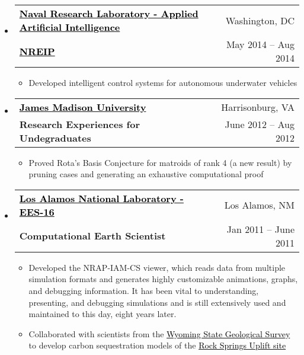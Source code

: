 \documentclass[letterpaper,12pt]{article}
\makeatletter
\newcommand{\link}[2]{\href{#1}{\textcolor{black}{#2}}}
\newcommand{\resitem}[1]{\item #1 \vspace{-2pt}}
\newcommand{\ressubheading}[4]{
	\begin{tabular*}{6.5in}{l@{\extracolsep{\fill}}r}
			\textbf{#1} & #2 \\
			\textbf{#3} & #4 \\
	\end{tabular*}\vspace{-6pt}
}
\makeatother
\begin{document}
\begin{itemize}
        \item \ressubheading
            {\link{http://www.nrl.navy.mil/}{Naval Research Laboratory - Applied Artificial Intelligence}}
            {Washington, DC}
            {\link{http://nreip.asee.org/}{NREIP}}
            {May 2014 -- Aug 2014}
				\begin{itemize}
                    \resitem{Developed intelligent control systems for autonomous underwater vehicles}
                \end{itemize}
		\item \ressubheading
            {\link{http://educ.jmu.edu/~vanwykla/reu/}{James Madison University}}
            {Harrisonburg, VA}
            {Research Experiences for Undegraduates}
            {June 2012 -- Aug 2012}
				\begin{itemize}
					\resitem{Proved Rota's Basis Conjecture for matroids of rank 4 (a new result) by pruning cases and generating an exhaustive computational proof}
                \end{itemize}
		\item \ressubheading
            {\link{http://www.lanl.gov}{Los Alamos National Laboratory - EES-16}}
            {Los Alamos, NM}
            {Computational Earth Scientist}
            {Jan 2011 -- June 2011}
				\begin{itemize}
					\resitem{Developed the NRAP-IAM-CS viewer, which reads data from multiple simulation formats and generates highly customizable animations, graphs, and debugging information. It has been vital to understanding, presenting, and debugging simulations and is still extensively used and maintained to this day, eight years later.}
					\resitem{Collaborated with scientists from the \link{http://www.wsgs.uwyo.edu/}{Wyoming State Geological Survey} to develop carbon sequestration models of the \link{http://www.wsgs.uwyo.edu/research/stratigraphy/RockSpringsUplift/Default.aspx}{Rock Springs Uplift site}}
				\end{itemize}
	\end{itemize}
	
\end{document}
